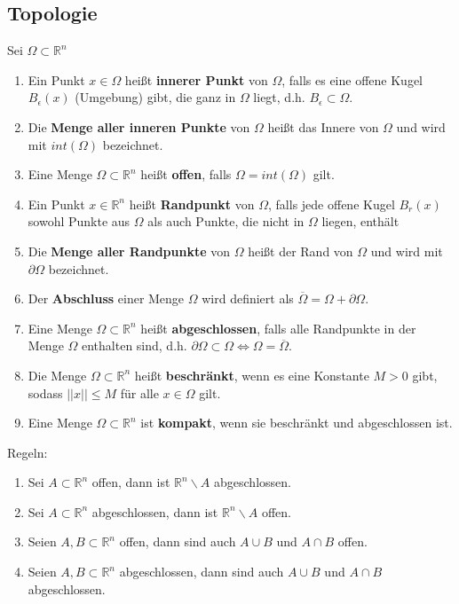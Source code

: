 \documentclass[a4paper,twocolumn,10pt]{article}
\begin{document}
\subsection{Topologie}
Sei $\Omega\subset\mathbb{R}^n$
\begin{enumerate}[label=$\bullet$]
\item Ein Punkt $x\in\Omega$ heißt \textbf{innerer Punkt} von $\Omega$, falls es eine offene Kugel $B_{\epsilon}(x)$ (Umgebung) gibt, die ganz in $\Omega$ liegt, d.h. $B_{\epsilon}\subset\Omega$.
\item Die \textbf{Menge aller inneren Punkte} von $\Omega$ heißt das Innere von $\Omega$ und wird mit $int(\Omega)$ bezeichnet.
\item Eine Menge $\Omega\subset\mathbb{R}^n$ heißt \textbf{offen}, falls $\Omega =int(\Omega)$ gilt.
\item Ein Punkt $x\in\mathbb{R}^n$ heißt \textbf{Randpunkt} von $\Omega$, falls jede offene Kugel $B_r(x)$ sowohl Punkte aus $\Omega$ als auch Punkte, die nicht in $\Omega$ liegen, enthält
\item Die \textbf{Menge aller Randpunkte} von $\Omega$ heißt der Rand von $\Omega$ und wird mit $\partial\Omega$ bezeichnet.
\item Der \textbf{Abschluss} einer Menge $\Omega$ wird definiert als $\overline{\Omega}=\Omega+\partial\Omega$.
\item Eine Menge $\Omega\subset\mathbb{R}^n$ heißt \textbf{abgeschlossen}, falls alle Randpunkte in der Menge $\Omega$ enthalten sind, d.h. $\partial\Omega\subset\Omega\Leftrightarrow\Omega=\overline{\Omega}$.
\item Die Menge $\Omega\subset\mathbb{R}^n$ heißt \textbf{beschränkt}, wenn es eine Konstante $M>0$ gibt, sodass $||x||\leq M$ für alle $x\in\Omega$ gilt.
\item Eine Menge $\Omega\subset\mathbb{R}^n$ ist \textbf{kompakt}, wenn sie beschränkt und abgeschlossen ist.
\end{enumerate}
Regeln:
\begin{enumerate}[label=$\bullet$]
\item Sei $A\subset\mathbb{R}^n$ offen, dann ist $\mathbb{R}^n\backslash A$ abgeschlossen.
\item Sei $A\subset\mathbb{R}^n$ abgeschlossen, dann ist $\mathbb{R}^n\backslash A$ offen.
\item Seien $A,B\subset\mathbb{R}^n$ offen, dann sind auch $A\cup B$ und $A\cap B$ offen.
\item Seien $A,B\subset\mathbb{R}^n$ abgeschlossen, dann sind auch $A\cup B$ und $A\cap B$ abgeschlossen.
\end{enumerate}
\end{document}
